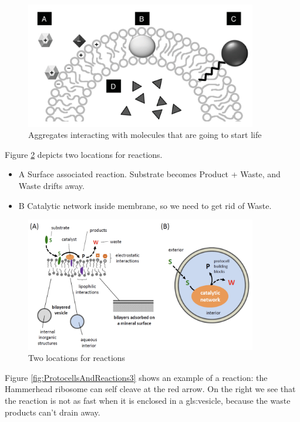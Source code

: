 \documentclass[]{article}
\begin{document}
\begin{figure}[H]
	\caption{Aggregates interacting with molecules that are going to start life}\label{fig:ProtocellsAndReactions1}
	\includegraphics[width=0.9\textwidth]{ProtocellsAndReactions1}
\end{figure}

Figure \ref{fig:ProtocellsAndReactions2} depicts two locations for reactions.
\begin{itemize}
	\item A Surface associated reaction. Substrate becomes Product + Waste, and Waste drifts away. 
	\item B Catalytic network inside membrane, so we need to get rid of Waste.
\end{itemize}
\begin{figure}[H]
	\caption{Two locations for reactions}\label{fig:ProtocellsAndReactions2}
	\includegraphics[width=0.9\textwidth]{ProtocellsAndReactions2}
\end{figure}

Figure \ref{fig:ProtocellsAndReactions3} shows an example of a reaction:  the Hammerhead ribosome can self cleave at the red arrow. On the right we see that the reaction is not as fast when it is enclosed in a \gls{gls:vesicle}, because the waste products can't drain away.
\end{document}
